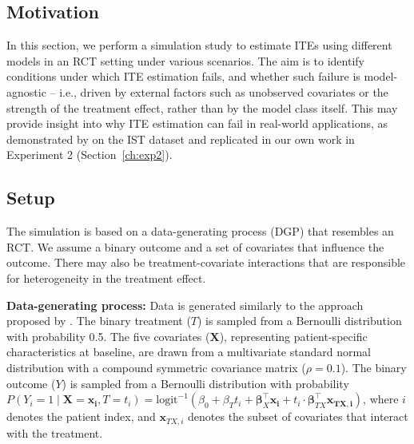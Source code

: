 \subsection{Motivation}

In this section, we perform a simulation study to estimate ITEs using different models in an RCT setting under various scenarios. The aim is to identify conditions under which ITE estimation fails, and whether such failure is model-agnostic -- i.e., driven by external factors such as unobserved covariates or the strength of the treatment effect, rather than by the model class itself. This may provide insight into why ITE estimation can fail in real-world applications, as demonstrated by \citet{chen2025} on the IST dataset and replicated in our own work in Experiment 2 (Section~\ref{ch:exp2}). 


\subsection{Setup} \label{sec:methods_experiment3}

The simulation is based on a data-generating process (DGP) that resembles an RCT. We assume a binary outcome and a set of covariates that influence the outcome. There may also be treatment-covariate interactions that are responsible for heterogeneity in the treatment effect.

\medskip

\textbf{Data-generating process:} Data is generated similarly to the approach proposed by \citet{hoogland2021}. The binary treatment ($T$) is sampled from a Bernoulli distribution with probability 0.5. The five covariates ($\mathbf{X}$), representing patient-specific characteristics at baseline, are drawn from a multivariate standard normal distribution with a compound symmetric covariance matrix ($\rho=0.1$). The binary outcome ($Y$) is sampled from a Bernoulli distribution with probability $P(Y_i = 1 \mid  \mathbf{X} = \mathbf{x_i}, T = t_i) = \text{logit}^{-1} \left(\beta_0 + \beta_T t_i + \boldsymbol{\beta}_X^\top \mathbf{x_i} + t_i \cdot \boldsymbol{\beta}_{TX}^\top \mathbf{x_{TX,i}} \right)$, where $i$ denotes the patient index, and $\mathbf{x}_{TX,i}$ denotes the subset of covariates that interact with the treatment.

